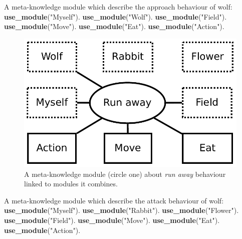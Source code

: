 \documentclass{aamas2012}
\begin{document}
	\begin{example}
		\label{run_away_example}
		A meta-knowledge module which describe the approach behaviour of wolf:\newline
		\newline
		\textbf{use\_module}("Myself").\newline
		\textbf{use\_module}("Wolf").\newline
		\textbf{use\_module}("Field").\newline
		\textbf{use\_module}("Move").\newline
		\textbf{use\_module}("Eat").\newline
		\textbf{use\_module}("Action").
	\end{example}
	
	\begin{figure}
		\centering
		\includegraphics[keepaspectratio=true, scale=0.4]{run_away.pdf}
		\caption
		{
			\label{run_away_figure}
			A meta-knowledge module (circle one) about \textit{run away} behaviour linked to modules it combines.
		}
	\end{figure}
	
	\begin{example}
		\label{feed_example}
		A meta-knowledge module which describe the attack behaviour of wolf:\newline
		\newline
		\textbf{use\_module}("Myself").\newline
		\textbf{use\_module}("Rabbit").\newline
		\textbf{use\_module}("Flower").\newline
		\textbf{use\_module}("Field").\newline
		\textbf{use\_module}("Move").\newline
		\textbf{use\_module}("Eat").\newline
		\textbf{use\_module}("Action").
	\end{example}
	
\end{document}

